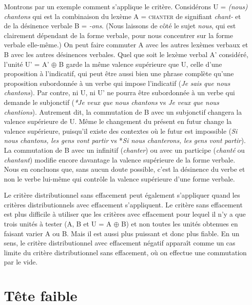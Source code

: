 Montrons par un exemple comment s’applique le critère. Considérons U = \textit{(nous) chantons} qui est la combinaison du lexème A = \textsc{chanter} de signifiant \textit{chant-} et de la désinence verbale B = \textit{{}-ons}. (Nous laissons de côté le sujet \textit{nous}, qui est clairement dépendant de la forme verbale, pour nous concentrer sur la forme verbale elle-même.)
On peut faire commuter A avec les autres lexèmes verbaux et B avec les autres désinences verbales. Quel que soit le lexème verbal A’ considéré, l’unité U’ =  A’ ${\oplus}$ B garde la même valence supérieure que U, celle d’une proposition à l’indicatif, qui peut être aussi bien une phrase complète qu’une proposition subordonnée à un verbe qui impose l’indicatif (\textit{Je sais que nous chantons}). Par contre, ni U, ni U’ ne pourra être subordonnée à un verbe qui demande le subjonctif (\textit{*Je veux que nous chantons} vs \textit{Je veux que nous chantions}). Autrement dit, la commutation de B avec un subjonctif changera la valence supérieure de U. Même le changement du présent en futur change la valence supérieure, puisqu’il existe des contextes où le futur est impossible (\textit{Si nous chantons, les gens vont partir} vs *\textit{Si nous chanterons, les gens vont partir}). La commutation de B avec un infinitif (\textit{chanter}) ou avec un participe (\textit{chanté} ou \textit{chantant}) modifie encore davantage la valence supérieure de la forme verbale. Nous en concluons que, sans aucun doute possible, c’est la désinence du verbe et non le verbe lui-même qui contrôle la valence supérieure d’une forme verbale.

Le critère distributionnel sans effacement peut également s’appliquer quand les critères distributionnels avec effacement s’appliquent. Le critère sans effacement est plus difficile à utiliser que les critères avec effacement pour lequel il n'y a que trois unités à tester (A, B et U = A ${\oplus}$ B) et non toutes les unités obtenues en faisant varier A ou B. Mais il est aussi plus puissant et donc plus fiable. En un sens, le critère distributionnel avec effacement négatif apparaît comme un cas limite du critère distributionnel sans effacement, où on effectue une commutation par le vide. 

\section{ Tête faible}\label{sec:3.3.14}

